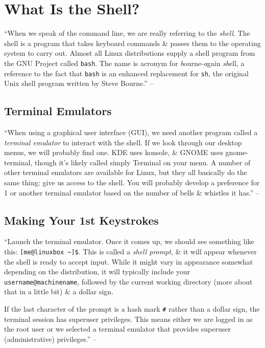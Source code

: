\documentclass[oneside]{book}
\numberwithin{equation}{section}
\begin{document}

\section{What Is the Shell?}
``When we speak of the command line, we are really referring to the \textit{shell}. The shell is a program that takes keyboard commands \& passes them to the operating system to carry out. Almost all Linux distributions supply a shell program from the GNU Project called \texttt{bash}. The name is acronym for \textit{b}ourne-\textit{a}gain \textit{sh}ell, a reference to the fact that \texttt{bash} is an enhanced replacement for \texttt{sh}, the original Unix shell program written by Steve Bourne.'' -- \cite[p. 38]{Shotts2019}

\subsection{Terminal Emulators}
``When using a graphical user interface (GUI), we need another program called a \textit{terminal emulator} to interact with the shell. If we look through our desktop menus, we will probably find one. KDE uses konsole, \& GNOME uses gnome-terminal, though it's likely called simply Terminal on your menu. A number of other terminal emulators are available for Linux, but they all basically do the same thing: give us access to the shell. You will probably develop a preference for 1 or another terminal emulator based on the number of bells \& whistles it has.'' -- \cite[p. 38]{Shotts2019}

\subsection{Making Your 1st Keystrokes}
``Launch the terminal emulator. Once it comes up, we should see something like this: \verb|[me@linuxbox ~]$|. This is called a \textit{shell prompt}, \& it will appear whenever the shell is ready to accept input. While it might vary in appearance somewhat depending on the distribution, it will typically include your \texttt{username@machinename}, followed by the current working directory (more about that in a little bit) \& a dollar sign.

If the last character of the prompt is a hash mark \texttt{\#} rather than a dollar sign, the terminal session has superuser privileges. This means either we are logged in as the root user or we selected a terminal emulator that provides superuser (administrative) privileges.'' -- \cite[p. 39]{Shotts2019}
\end{document}
